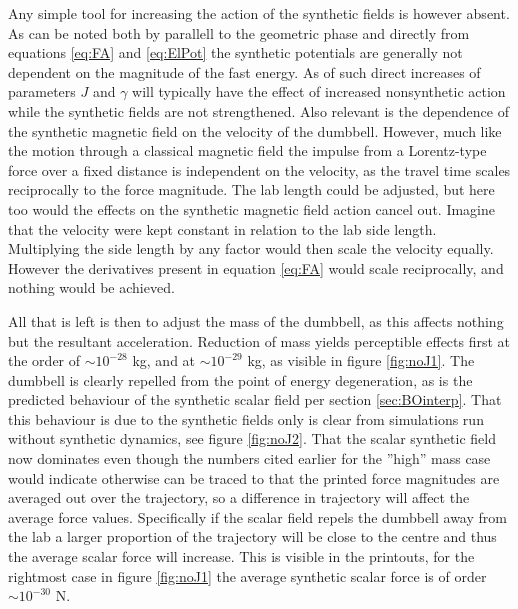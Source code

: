 \documentclass[main.tex]{subfiles}
\begin{document}
Any simple tool for increasing the action of the synthetic fields is however absent. As can
be noted both by parallell to the geometric phase and directly from equations \ref{eq:FA}
and \ref{eq:ElPot} the synthetic potentials are generally not dependent on the magnitude of
the fast energy. As of such direct increases of parameters \(J\) and \(\gamma\) will typically
have the effect of increased nonsynthetic action while the synthetic fields are not
strengthened. Also relevant is the dependence of the synthetic magnetic field on the
velocity of the dumbbell. However, much like the motion through a classical magnetic field
the impulse from a Lorentz-type force over a fixed distance is independent on the velocity,
as the travel time scales reciprocally to the force magnitude. The lab length could be
adjusted, but here too would the effects on the synthetic magnetic field action cancel out.
Imagine that the velocity were kept constant in relation to the lab side length.
Multiplying the side length by any factor would then scale the velocity equally. However
the derivatives present in equation \ref{eq:FA} would scale reciprocally, and nothing would
be achieved.

All that is left is then to adjust the mass of the dumbbell, as this affects nothing but
the resultant acceleration. Reduction of mass yields perceptible effects first
at the order of \(\sim 10^{-28}\) kg, and at \(\sim 10^{-29}\) kg, as visible in figure
\ref{fig:noJ1}. %
The dumbbell is clearly repelled from the point of energy degeneration, as is the predicted
behaviour of the synthetic scalar field per section \ref{sec:BOinterp}. That this behaviour
is due to the synthetic fields only is clear from simulations run without synthetic
dynamics, see figure \ref{fig:noJ2}. That the scalar synthetic field now dominates even
though the numbers cited earlier for the ''high'' mass case would indicate otherwise can be
traced to that the printed force magnitudes are averaged out over the trajectory, so a
difference in trajectory will affect the average force values. Specifically if the scalar
field repels the dumbbell away from the lab a larger proportion of the trajectory will be
close to the centre and thus the average scalar force will increase. This is visible in the
printouts, for the rightmost case in figure \ref{fig:noJ1} the average synthetic scalar
force is of order \(\sim 10^{-30}\) N.
\end{document}

